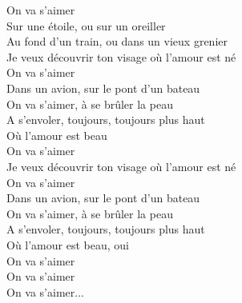 \documentclass{novel}
\begin{document}
\begin{multicols}{2}
On va s'aimer \\
Sur une étoile, ou sur un oreiller \\
Au fond d'un train, ou dans un vieux grenier \\
Je veux découvrir ton visage où l'amour est né \\

On va s'aimer \\
Dans un avion, sur le pont d'un bateau \\
On va s'aimer, à  se brûler la peau \\
A s'envoler, toujours, toujours plus haut \\
Où l'amour est beau \\

On va s'aimer \\
Je veux découvrir ton visage où l'amour est né \\
On va s'aimer \\
Dans un avion, sur le pont d'un bateau \\
On va s'aimer, à  se brûler la peau \\
A s'envoler, toujours, toujours plus haut \\
Où l'amour est beau, oui \\
On va s'aimer \\
On va s'aimer \\
On va s'aimer...
\end{multicols}
\end{document}
